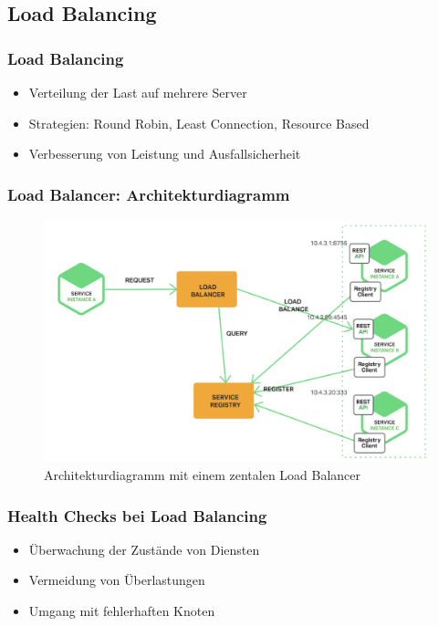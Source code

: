 \subsection{Load Balancing}

\begin{frame}
    \frametitle{Load Balancing}
    \begin{itemize}
        \item Verteilung der Last auf mehrere Server
        \item Strategien: Round Robin, Least Connection, Resource Based
        \item Verbesserung von Leistung und Ausfallsicherheit
    \end{itemize}
\end{frame}

\begin{frame}
    \frametitle{Load Balancer: Architekturdiagramm}
    \begin{figure}[h]
        \centering
        \includegraphics[height=0.5\textheight]{images/loadbalancer}
        \caption{Architekturdiagramm mit einem zentalen Load Balancer}
    \end{figure}
\end{frame}


\begin{frame}
    \frametitle{Health Checks bei Load Balancing}
    \begin{itemize}
        \item Überwachung der Zustände von Diensten
        \item Vermeidung von Überlastungen
        \item Umgang mit fehlerhaften Knoten
    \end{itemize}
\end{frame}

